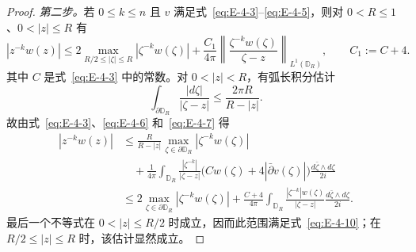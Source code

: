 \begin{proof}
\emph{第二步。}若 $0\le k\le n$ 且 $v$ 满足式~\eqref{eq:E-4-3}--\eqref{eq:E-4-5}，则对 $0<R\le1$、$0<|z|\le R$ 有
\begin{equation}\label{eq:E-4-10}
  |z^{-k}w(z)|
  \le2\max_{R/2\le|\zeta|\le R}|\zeta^{-k}w(\zeta)|
   +\frac{C_1}{4\pi}
    \left\|\frac{\zeta^{-k}w(\zeta)}{\zeta-z}\right\|_{L^1(\mathbb D_R)},
  \qquad C_1:=C+4.
\end{equation}
其中 $C$ 是式~\eqref{eq:E-4-3} 中的常数。对 $0<|z|<R$，有弧长积分估计
\[
  \int_{\partial\mathbb D_R}\frac{|d\zeta|}{|\zeta-z|}
  \le\frac{2\pi R}{R-|z|}.
\]
故由式~\eqref{eq:E-4-3}、\eqref{eq:E-4-6} 和~\eqref{eq:E-4-7} 得
\begin{align*}
|z^{-k}w(z)|
&\le\frac{R}{R-|z|}\max_{\zeta\in\partial\mathbb D_R}
       |\zeta^{-k}w(\zeta)|\\
&\quad+\frac1{4\pi}\int_{\mathbb D_R}
  \frac{|\zeta^{-k}|}{|\zeta-z|}
  \bigl(Cw(\zeta)+4|\bar\partial v(\zeta)|\bigr)
  \frac{d\bar\zeta\wedge d\zeta}{2i}\\
&\le2\max_{\zeta\in\partial\mathbb D_R}
       |\zeta^{-k}w(\zeta)|
  +\frac{C+4}{4\pi}\int_{\mathbb D_R}
       \frac{|\zeta^{-k}|w(\zeta)}{|\zeta-z|}
       \frac{d\bar\zeta\wedge d\zeta}{2i}.
\end{align*}
最后一个不等式在 $0<|z|\le R/2$ 时成立，因而此范围满足式~\eqref{eq:E-4-10}；在 $R/2\le|z|\le R$ 时，该估计显然成立。


\end{proof}
